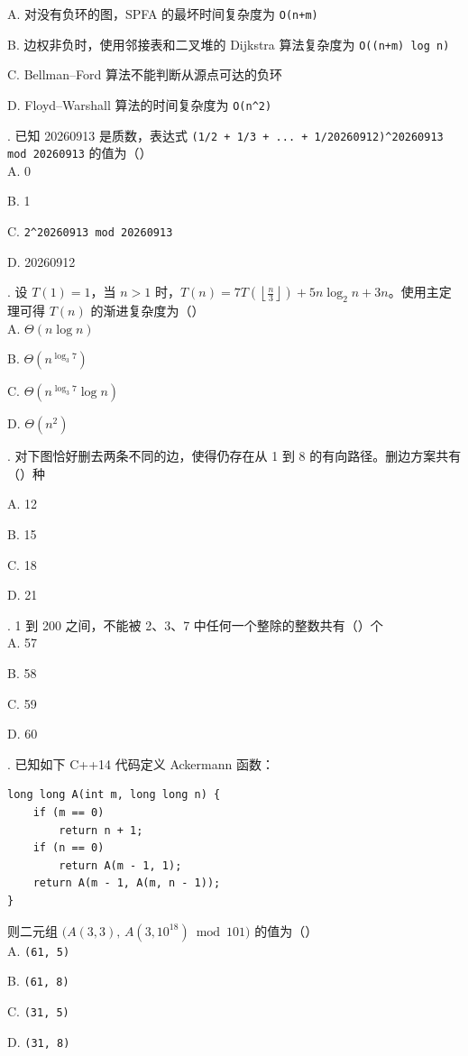 \documentclass[a4paper]{ctexart}
\newcommand{\q}[1]{\noindent #1}
\newcommand{\opt}[1]{\hspace*{2em} #1\par}
\begin{document}
\opt{A. 对没有负环的图，SPFA 的最坏时间复杂度为 \texttt{O(n+m)}}
\opt{B. 边权非负时，使用邻接表和二叉堆的 Dijkstra 算法复杂度为 \texttt{O((n+m) log n)}}
\opt{C. Bellman--Ford 算法不能判断从源点可达的负环}
\opt{D. Floyd--Warshall 算法的时间复杂度为 \texttt{O(n\string^2)}}
\q{11.} 已知 20260913 是质数，表达式 \texttt{(1/2 + 1/3 + ... + 1/20260912)\^{}20260913 mod 20260913} 的值为（\qquad）\\
\opt{A. 0}\opt{B. 1}\opt{C. \texttt{2\^{}20260913 mod 20260913}}\opt{D. 20260912}
\clearpage
\q{12.} 设 \(T(1)=1\)，当 \(n>1\) 时，\(T(n)=7T\left(\left\lfloor\frac{n}{3}\right\rfloor\right)+5n\log_2 n+3n\)。使用主定理可得 \(T(n)\) 的渐进复杂度为（\qquad）\\
\opt{A. \(\Theta(n\log n)\)}\opt{B. \(\Theta(n^{\log_3 7})\)}
\opt{C. \(\Theta(n^{\log_3 7}\log n)\)}\opt{D. \(\Theta(n^2)\)}

\q{13.} 对下图恰好删去两条不同的边，使得仍存在从 1 到 8 的有向路径。删边方案共有（\qquad）种
\begin{center}
\end{center}
\opt{A. 12}\opt{B. 15}\opt{C. 18}\opt{D. 21}

\q{14.} 1 到 200 之间，不能被 2、3、7 中任何一个整除的整数共有（\qquad）个\\
\opt{A. 57}\opt{B. 58}\opt{C. 59}\opt{D. 60}
\begin{minipage}{\linewidth}
\q{15.} 已知如下 C++14 代码定义 Ackermann 函数：
\begin{codebox}\begin{lstlisting}
long long A(int m, long long n) {
    if (m == 0)
        return n + 1;
    if (n == 0)
        return A(m - 1, 1);
    return A(m - 1, A(m, n - 1));
}
\end{lstlisting}\end{codebox}
则二元组 \(\bigl(A(3,3),\,A(3,10^{18})\bmod 101\bigr)\) 的值为（\qquad）\\
\opt{A. \texttt{(61, 5)}}\opt{B. \texttt{(61, 8)}}
\opt{C. \texttt{(31, 5)}}\opt{D. \texttt{(31, 8)}}
\end{minipage}
\end{document}
